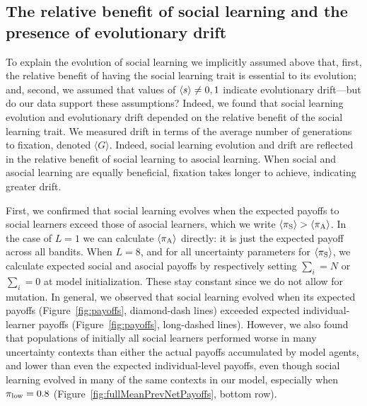 \documentclass[letterpaper,11.5pt]{scrartcl}
\begin{document}
\subsection{The relative benefit of social learning and the presence of evolutionary drift}

To explain the evolution of social learning we implicitly assumed above that, first,
the relative benefit of having the social learning trait is essential to its
evolution; and, second, we assumed that values of $\langle s \rangle \neq 0,1$ indicate
evolutionary drift---but do our data support these assumptions?  Indeed, we found that
social learning evolution and evolutionary drift depended on the relative benefit of
the social learning trait. We measured drift in terms of the average number of
generations to fixation, denoted $\langle G \rangle$. Indeed, social learning
evolution and drift are reflected in the relative benefit of social learning to
asocial learning.  When social and asocial learning are equally beneficial, fixation
takes longer to achieve, indicating greater drift.

First, we confirmed that social learning evolves when the expected payoffs to social
learners exceed those of asocial learners, which we write $\langle \pi_\mathrm{S} \rangle > \langle \pi_\mathrm{A} \rangle$.
In the case of $L=1$ we can calculate $\langle \pi_\mathrm{A} \rangle$ directly: it is just the expected
payoff across all bandits. When $L=8$, and for all uncertainty parameters for
$\langle \pi_\mathrm{S} \rangle$, we calculate expected social and asocial payoffs by respectively setting
$\sum_i = N$ or $\sum_i = 0$ at model initialization. These stay constant since we do
not allow for mutation.  
In general, we observed that social learning evolved when its expected payoffs
(Figure~\ref{fig:payoffs}, diamond-dash lines) exceeded expected individual-learner
payoffs (Figure~\ref{fig:payoffs}, long-dashed lines). 
However, we also found that populations of initially all social learners performed worse
in many uncertainty contexts than either the actual payoffs accumulated by 
model agents, and lower than even the expected individual-level payoffs,
even though social learning evolved in many of the same contexts in our model,
especially when $\pi_{\mathrm{low}} = 0.8$ 
(Figure~\ref{fig:fullMeanPrevNetPayoffs}, bottom row). 
\end{document}
